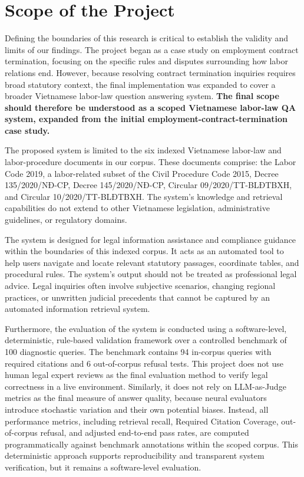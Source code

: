 \section{Scope of the Project}
Defining the boundaries of this research is critical to establish the validity and limits of our findings. The project began as a case study on employment contract termination, focusing on the specific rules and disputes surrounding how labor relations end. However, because resolving contract termination inquiries requires broad statutory context, the final implementation was expanded to cover a broader Vietnamese labor-law question answering system. \textbf{The final scope should therefore be understood as a scoped Vietnamese labor-law QA system, expanded from the initial employment-contract-termination case study.}

The proposed system is limited to the six indexed Vietnamese labor-law and labor-procedure documents in our corpus. These documents comprise: the Labor Code 2019, a labor-related subset of the Civil Procedure Code 2015, Decree 135/2020/NĐ-CP, Decree 145/2020/NĐ-CP, Circular 09/2020/TT-BLĐTBXH, and Circular 10/2020/TT-BLĐTBXH. The system's knowledge and retrieval capabilities do not extend to other Vietnamese legislation, administrative guidelines, or regulatory domains.

The system is designed for legal information assistance and compliance guidance within the boundaries of this indexed corpus. It acts as an automated tool to help users navigate and locate relevant statutory passages, coordinate tables, and procedural rules. The system's output should not be treated as professional legal advice. Legal inquiries often involve subjective scenarios, changing regional practices, or unwritten judicial precedents that cannot be captured by an automated information retrieval system.

Furthermore, the evaluation of the system is conducted using a software-level, deterministic, rule-based validation framework over a controlled benchmark of 100 diagnostic queries. The benchmark contains 94 in-corpus queries with required citations and 6 out-of-corpus refusal tests. This project does not use human legal expert reviews as the final evaluation method to verify legal correctness in a live environment. Similarly, it does not rely on LLM-as-Judge metrics as the final measure of answer quality, because neural evaluators introduce stochastic variation and their own potential biases. Instead, all performance metrics, including retrieval recall, Required Citation Coverage, out-of-corpus refusal, and adjusted end-to-end pass rates, are computed programmatically against benchmark annotations within the scoped corpus. This deterministic approach supports reproducibility and transparent system verification, but it remains a software-level evaluation.


